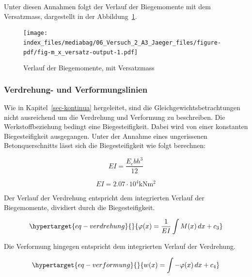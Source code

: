 \documentclass[
  12pt,
  letterpaper,
  egregdoesnotlikesansseriftitles]{scrreprt}
\begin{document}
Unter diesen Annahmen folgt der Verlauf der Biegemomente mit dem
Versatzmass, dargestellt in der Abbildung~\ref{fig-m_x_versatz}.

\begin{figure}[H]

{\centering \texttt{[image: index\_files/mediabag/06\_Versuch\_2\_A3\_Jaeger\_files/figure-pdf/fig-m\_x\_versatz-output-1.pdf]}

}

\caption{\label{fig-m_x_versatz}Verlauf der Biegemomente, mit
Versatzmass}

\end{figure}

\hypertarget{verdrehung--und-verformungslinien}{%
\subsubsection{Verdrehung- und
Verformungslinien}\label{verdrehung--und-verformungslinien}}

Wie in Kapitel~\ref{sec-kontinua} hergeleitet, sind die
Gleichgewichtsbetrachtungen nicht ausreichend um die Verdrehung und
Verformung zu beschreiben. Die Werkstoffbeziehung bedingt eine
Biegesteifigkeit. Dabei wird von einer konstanten Biegesteifigkeit
ausgegangen. Unter der Annahme eines ungerissenen Betonquerschnitts
lässt sich die Biegesteifigkeit wie folgt berechnen:

\begin{equation}EI = \frac{E_{c} b h^{3}}{12}\end{equation}

\begin{equation}EI = 2.07 \cdot 10^{4} \text{kN} \text{m}^{2}\end{equation}

Der Verlauf der Verdrehung entspricht dem integrierten Verlauf der
Biegemomente, dividiert durch die Biegesteifigkeit.

\begin{equation}\protect\hypertarget{eq-verdrehung}{}{
\varphi(x) = \frac{1}{EI}\int M(x) \, dx + c_3
}\label{eq-verdrehung}\end{equation}

Die Verformung hingegen entspricht dem integrierten Verlauf der
Verdrehung.

\begin{equation}\protect\hypertarget{eq-verformung}{}{
w(x) = \int -\varphi(x) \, dx + c_4
}\label{eq-verformung}\end{equation}
\end{document}

